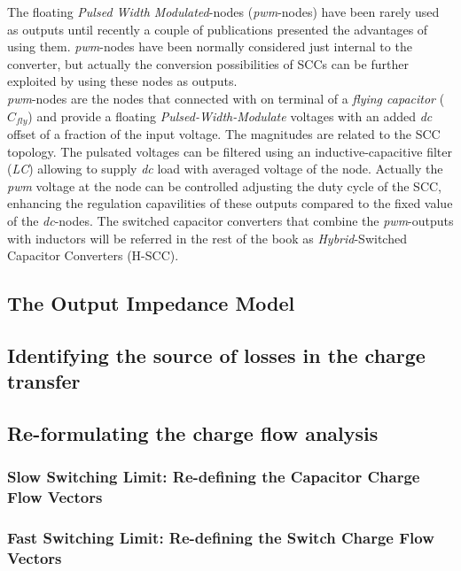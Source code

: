 The floating \emph{Pulsed Width Modulated}-nodes (\emph{pwm}-nodes) have been rarely used as outputs until recently a couple of publications \cite{Kumar12,Kline12} presented the advantages of using them. \emph{pwm}-nodes have been normally considered just internal to the converter, but actually the conversion possibilities of SCCs can be further exploited by using these nodes as outputs. \\


\emph{pwm}-nodes are the nodes that connected with on terminal of a \emph{flying capacitor} ($C_{fly}$) and provide a  floating \emph{Pulsed-Width-Modulate} voltages with an added \emph{dc} offset of a fraction of the input voltage. The magnitudes are related to the SCC topology. The pulsated voltages can be filtered using an inductive-capacitive filter (\emph{LC}) allowing to supply \emph{dc} load with averaged voltage of the node. Actually the \emph{pwm} voltage at the node can be controlled adjusting the duty
cycle of the SCC, enhancing the regulation capavilities of these outputs compared to the fixed value of the \emph{dc}-nodes.
The switched capacitor converters that combine the \emph{pwm}-outputs with inductors will be referred in the rest of the book as
\emph{Hybrid}-Switched Capacitor Converters (H-SCC).



\subsection{The Output Impedance Model}
\subsection{Identifying the source of losses in the charge transfer}
\subsection{Re-formulating the charge flow analysis}
\subsubsection[SSL Capacitor Charge Flow]{Slow Switching Limit: Re-defining the Capacitor Charge Flow Vectors}
\subsubsection[FSL Switch Charge Flow]{Fast Switching Limit: Re-defining the Switch Charge Flow Vectors}

